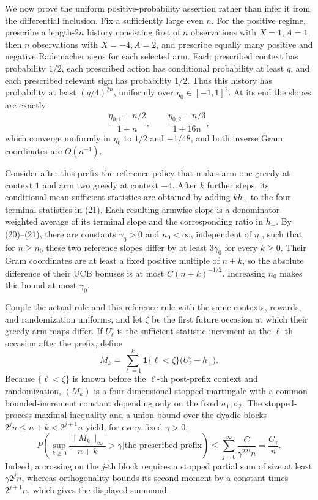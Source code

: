 We now prove the uniform positive-probability assertion rather than infer it from the differential inclusion. Fix a sufficiently large even \(n\). For the positive regime, prescribe a length-\(2n\) history consisting first of \(n\) observations with \(X=1,A=1\), then \(n\) observations with \(X=-4,A=2\), and prescribe equally many positive and negative Rademacher signs for each selected arm. Each prescribed context has probability \(1/2\), each prescribed action has conditional probability at least \(q\), and each prescribed relevant sign has probability \(1/2\). Thus this history has probability at least \((q/4)^{2n}\), uniformly over \(\eta_0\in[-1,1]^2\). At its end the slopes are exactly
\[
 \frac{\eta_{0,1}+n/2}{1+n},\qquad
 \frac{\eta_{0,2}-n/3}{1+16n}, \tag{21}
\]
which converge uniformly in \(\eta_0\) to \(1/2\) and \(-1/48\), and both inverse Gram coordinates are \(O(n^{-1})\).

Consider after this prefix the reference policy that makes arm one greedy at context \(1\) and arm two greedy at context \(-4\). After \(k\) further steps, its conditional-mean sufficient statistics are obtained by adding \(kh_+\) to the four terminal statistics in (21). Each resulting armwise slope is a denominator-weighted average of its terminal slope and the corresponding ratio in \(h_+\). By (20)--(21), there are constants \(\gamma_0>0\) and \(n_0<\infty\), independent of \(\eta_0\), such that for \(n\geq n_0\) these two reference slopes differ by at least \(3\gamma_0\) for every \(k\geq0\). Their Gram coordinates are at least a fixed positive multiple of \(n+k\), so the absolute difference of their UCB bonuses is at most \(C(n+k)^{-1/2}\). Increasing \(n_0\) makes this bound at most \(\gamma_0\).

Couple the actual rule and this reference rule with the same contexts, rewards, and randomization uniforms, and let \(\zeta\) be the first future occasion at which their greedy-arm maps differ. If \(U^{\circ}_\ell\) is the sufficient-statistic increment at the \(\ell\)-th occasion after the prefix, define
\[
 M_k=\sum_{\ell=1}^k\mathbf 1\{\ell<\zeta\}\bigl(U^{\circ}_\ell-h_+\bigr).
\]
Because \(\{\ell<\zeta\}\) is known before the \(\ell\)-th post-prefix context and randomization, \((M_k)\) is a four-dimensional stopped martingale with a common bounded-increment constant depending only on the fixed \(\sigma_1,\sigma_2\). The stopped-process maximal inequality and a union bound over the dyadic blocks \(2^jn\leq n+k<2^{j+1}n\) yield, for every fixed \(\gamma>0\),
\[
 P\left(\sup_{k\geq0}\frac{\|M_k\|_\infty}{n+k}>\gamma
 \mathrel{\Big|}\text{the prescribed prefix}\right)
 \leq \sum_{j=0}^{\infty}\frac{C}{\gamma^22^jn}
 =\frac{C_\gamma}{n}. \tag{22}
\]
Indeed, a crossing on the \(j\)-th block requires a stopped partial sum of size at least \(\gamma2^jn\), whereas orthogonality bounds its second moment by a constant times \(2^{j+1}n\), which gives the displayed summand.

